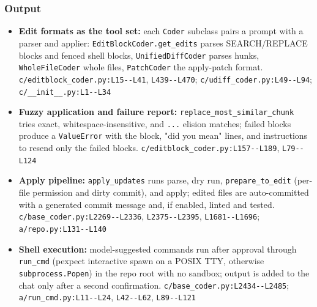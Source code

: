 \subsubsection*{Output}
\begin{itemize}
\item \textbf{Edit formats as the tool set:} each \texttt{Coder} subclass pairs a prompt with a parser and applier: \texttt{EditBlockCoder.\allowbreak{}get\_\allowbreak{}edits} parses SEARCH/REPLACE blocks and fenced shell blocks, \texttt{UnifiedDiffCoder} parses hunks, \texttt{WholeFileCoder} whole files, \texttt{PatchCoder} the apply-patch format. \texttt{c/\allowbreak{}editblock\_\allowbreak{}coder.\allowbreak{}py:\allowbreak{}L15-\allowbreak{}-\allowbreak{}L41}, \texttt{L439-\allowbreak{}-\allowbreak{}L470}; \texttt{c/\allowbreak{}udiff\_\allowbreak{}coder.\allowbreak{}py:\allowbreak{}L49-\allowbreak{}-\allowbreak{}L94}; \texttt{c/\allowbreak{}\_\allowbreak{}\_\allowbreak{}init\_\allowbreak{}\_\allowbreak{}.\allowbreak{}py:\allowbreak{}L1-\allowbreak{}-\allowbreak{}L34}
\item \textbf{Fuzzy application and failure report:} \texttt{replace\_\allowbreak{}most\_\allowbreak{}similar\_\allowbreak{}chunk} tries exact, whitespace-insensitive, and \texttt{.\allowbreak{}.\allowbreak{}.\allowbreak{}} elision matches; failed blocks produce a \texttt{ValueError} with the block, "did you mean" lines, and instructions to resend only the failed blocks. \texttt{c/\allowbreak{}editblock\_\allowbreak{}coder.\allowbreak{}py:\allowbreak{}L157-\allowbreak{}-\allowbreak{}L189}, \texttt{L79-\allowbreak{}-\allowbreak{}L124}
\item \textbf{Apply pipeline:} \texttt{apply\_\allowbreak{}updates} runs parse, dry run, \texttt{prepare\_\allowbreak{}to\_\allowbreak{}edit} (per-file permission and dirty commit), and apply; edited files are auto-committed with a generated commit message and, if enabled, linted and tested. \texttt{c/\allowbreak{}base\_\allowbreak{}coder.\allowbreak{}py:\allowbreak{}L2269-\allowbreak{}-\allowbreak{}L2336}, \texttt{L2375-\allowbreak{}-\allowbreak{}L2395}, \texttt{L1681-\allowbreak{}-\allowbreak{}L1696}; \texttt{a/\allowbreak{}repo.\allowbreak{}py:\allowbreak{}L131-\allowbreak{}-\allowbreak{}L140}
\item \textbf{Shell execution:} model-suggested commands run after approval through \texttt{run\_\allowbreak{}cmd} (pexpect interactive spawn on a POSIX TTY, otherwise \texttt{subprocess.\allowbreak{}Popen}) in the repo root with no sandbox; output is added to the chat only after a second confirmation. \texttt{c/\allowbreak{}base\_\allowbreak{}coder.\allowbreak{}py:\allowbreak{}L2434-\allowbreak{}-\allowbreak{}L2485}; \texttt{a/\allowbreak{}run\_\allowbreak{}cmd.\allowbreak{}py:\allowbreak{}L11-\allowbreak{}-\allowbreak{}L24}, \texttt{L42-\allowbreak{}-\allowbreak{}L62}, \texttt{L89-\allowbreak{}-\allowbreak{}L121}

\end{itemize}
